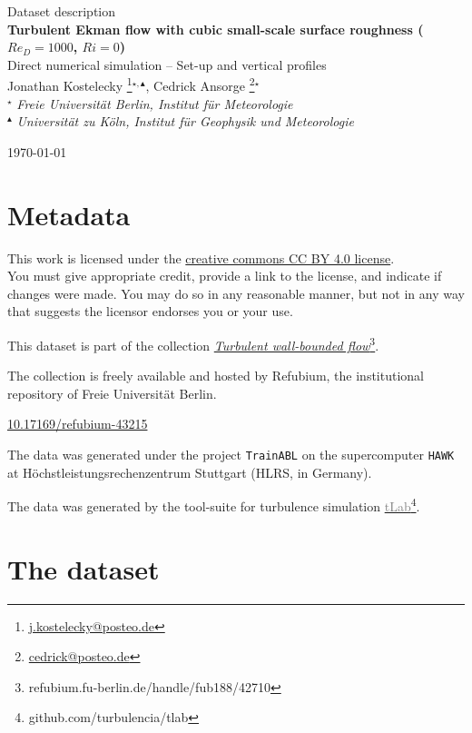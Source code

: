 \documentclass[11pt]{article}
\date{\nodate}
\makeatletter
\newcommand{\dstitle}{Turbulent Ekman flow with cubic small-scale surface roughness ($Re_D=1000$, $Ri=0$)}
\newcommand{\subtitle}{Direct numerical simulation -- Set-up and vertical profiles}
\newcommand{\doi}{10.17169/refubium-43215}
\newcommand{\tlabName}{\textcolor{gray}{tLab}}
\newcommand{\authors}{
    Jonathan Kostelecky \footnote{\href{mailto:j.kostelecky@posteo.de}{j.kostelecky@posteo.de}}$^{\star,\blacktriangle}$, \hspace{0.05cm}  
    Cedrick Ansorge     \footnote{\href{mailto:cedrick@posteo.de}{cedrick@posteo.de}}$^\star$ \\  
    {\small \light{$^\star$ \emph{ Freie Universit\"at Berlin, Institut f\"ur Meteorologie} \\
    $^{\blacktriangle}$ \emph{Universit\"at zu K\"oln, Institut f\"ur Geophysik und Meteorologie}}}}
\newcommand{\light}[1]{\textcolor{black!80}{#1}}
\newcommand{\printdoi}[1]{\href{https://dx.doi.org/#1}{#1}}
\makeatother
\begin{document}
{ \selectfont
\begin{centering}

 \light{\large Dataset description} \\[1em] 
 {\LARGE \bfseries \sffamily\dstitle} \\[1em]
 \light{\large\subtitle} \\[1em]
 \authors\\ 
\end{centering}
\light{\hfill \today}
}


\section{Metadata}
\begin{description}
\sffamily
\item[\textcopyright] This work is licensed under the \href{https://creativecommons.org/licenses/by/4.0}{creative commons CC BY 4.0 license}. \\ {\small\light{You must give appropriate credit, provide a link to the license, and indicate if changes were made. You may do so in any reasonable manner, but not in any way that suggests the licensor endorses you or your use. }}
\item[\sffamily Collection] This dataset is part of the collection \href{https://refubium.fu-berlin.de/handle/fub188/42710}{\emph{Turbulent wall-bounded flow}\footnote{\url{refubium.fu-berlin.de/handle/fub188/42710}}}.

{\small \light{The collection is freely available and hosted by Refubium, the  institutional repository of Freie Universit\"at Berlin.}}

\item[\sffamily DOI]\printdoi{\doi}
\item[\sffamily HPC systems] The data was generated under the project \texttt{TrainABL} on the supercomputer \texttt{HAWK} at Höchstleistungsrechenzentrum Stuttgart (HLRS, in Germany). 
\item[\sffamily Code] The data was generated by the tool-suite for turbulence simulation \href{https://github.com/turbulencia/tlab}{\tlabName\footnote{\url{github.com/turbulencia/tlab}}}.
\end{description}

\section{The dataset}
\end{document}
